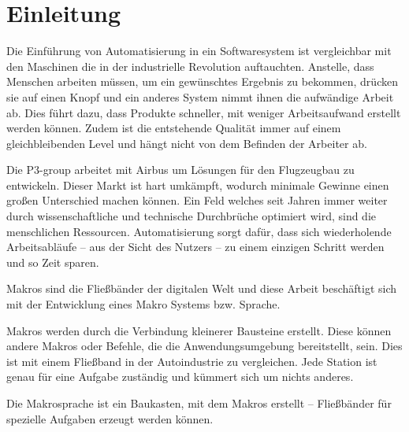 




\tableofcontents
\newpage

\section{Einleitung}
\label{sec:einleitung}
  Die Einführung von Automatisierung in ein Softwaresystem ist vergleichbar mit den Maschinen die in der industrielle Revolution auftauchten. Anstelle, dass Menschen arbeiten müssen, um ein gewünschtes Ergebnis zu bekommen, drücken sie auf einen Knopf und ein anderes System nimmt ihnen die aufwändige Arbeit ab. Dies führt dazu, dass Produkte schneller, mit weniger Arbeitsaufwand erstellt werden können. Zudem ist die entstehende Qualität immer auf einem gleichbleibenden Level und hängt nicht von dem Befinden der Arbeiter ab.

  Die P3-group arbeitet mit Airbus um Lösungen für den Flugzeugbau zu entwickeln. Dieser Markt ist hart umkämpft, wodurch minimale Gewinne einen großen Unterschied machen können. Ein Feld welches seit Jahren immer weiter durch wissenschaftliche und technische Durchbrüche optimiert wird, sind die menschlichen Ressourcen. Automatisierung sorgt dafür, dass sich wiederholende Arbeitsabläufe -- aus der Sicht des Nutzers -- zu einem einzigen Schritt werden und so Zeit sparen.

  Makros sind die Fließbänder der digitalen Welt und diese Arbeit beschäftigt sich mit der Entwicklung eines Makro Systems bzw. Sprache.

  Makros werden durch die Verbindung kleinerer Bausteine erstellt. Diese können andere Makros oder Befehle, die die Anwendungsumgebung bereitstellt, sein. Dies ist mit einem Fließband in der Autoindustrie zu vergleichen. Jede Station ist genau für eine Aufgabe zuständig und kümmert sich um nichts anderes.

  Die Makrosprache ist ein Baukasten, mit dem Makros erstellt -- Fließbänder für spezielle Aufgaben erzeugt werden können.


